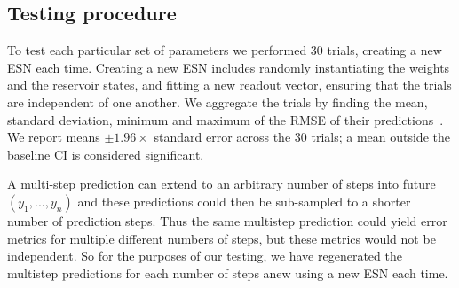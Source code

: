 \subsection{Testing procedure}

To test each particular set of parameters we performed 30 trials, creating a new ESN each time. Creating a new ESN includes randomly instantiating the weights and the reservoir states, and fitting a new readout vector, ensuring that the trials are independent of one another. We aggregate the trials by finding the mean, standard deviation, minimum and maximum of the RMSE of their predictions~\cite{lukosevicius_2012_practical_guide}. We report means $\pm 1.96 \times$ standard error across the 30 trials; a mean outside the baseline CI is considered significant.

A multi-step prediction can extend to an arbitrary number of steps into future $(y_1,...,y_n)$ and these predictions could then be sub-sampled to a shorter number of prediction steps. Thus the same multistep prediction could yield error metrics for multiple different numbers of steps, but these metrics would not be independent. So for the purposes of our testing, we have regenerated the multistep predictions for each number of steps anew using a new ESN each time.
